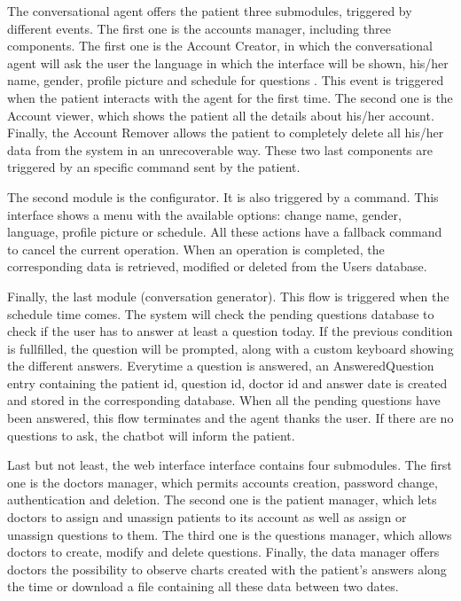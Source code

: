 \documentclass[12pt,english]{article}
\begin{document}
The conversational agent offers the patient three submodules, triggered by different events. The first one is the accounts manager, including three components. The first one is the Account Creator, in which the conversational agent will ask the user the language in which the interface will be shown, his/her name, gender, profile picture and schedule for questions . This event is triggered when the patient interacts with the agent for the first time. The second one is the Account viewer, which shows the patient all the details about his/her account. Finally, the Account Remover allows the patient to completely delete all his/her data from the system in an unrecoverable way. These two last components are triggered by an specific command sent by the patient.

The second module is the configurator. It is also triggered by a command. This interface shows a menu with the available options: change name, gender, language, profile picture or schedule. All these actions have a fallback command to cancel the current operation. When an operation is completed, the corresponding data is retrieved, modified or deleted from the Users database.

Finally, the last module (conversation generator). This flow is triggered when the schedule time comes. The system will check the pending questions database to check if the user has to answer at least a question today. If the previous condition is fullfilled, the question will be prompted, along with a custom keyboard showing the different answers. Everytime a question is answered, an AnsweredQuestion entry containing the patient id, question id, doctor id and answer date is created and stored in the corresponding database. When all the pending questions have been answered, this flow terminates and the agent thanks the user. If there are no questions to ask, the chatbot will inform the patient.

Last but not least, the web interface interface contains four submodules. The first one is the doctors manager, which permits accounts creation, password change, authentication and deletion. The second one is the patient manager, which lets doctors to assign and unassign patients to its account as well as assign or unassign questions to them. The third one is the questions manager, which allows doctors to create, modify and delete questions. Finally, the data manager offers doctors the possibility to observe charts created with the patient's answers along the time or download a file containing all these data between two dates.
\end{document}
